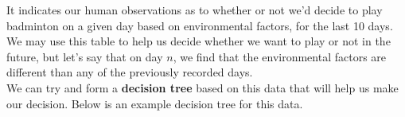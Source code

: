 \documentclass[english, 10pt]{article}
\begin{document}
\hfill \break It indicates our human observations as to whether or not we'd decide to play badminton on a given day based on environmental factors, for the last 10 days.\\

We may use this table to help us decide whether we want to play or not in the future, but let's say that on day $n$, we find that the environmental factors are different than any of the previously recorded days.\\

We can try and form a \textbf{decision tree} based on this data that will help us make our decision. Below is an example decision tree for this data.

{
\centering




\begin{tikzpicture}[x=0.75pt,y=0.75pt,yscale=-1,xscale=1]


\end{tikzpicture}}
\end{document}
